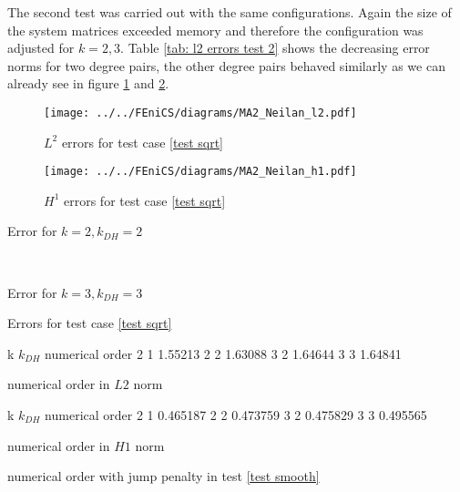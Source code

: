 
The second test was carried out with the same configurations. Again the size of the system matrices exceeded memory and therefore the configuration was adjusted for $k=2,3$. Table \ref{tab: l2 errors test 2} shows the decreasing error norms for two degree pairs, the other degree pairs behaved similarly as we can already see in figure \ref{fig: l2 errors test 2} and \ref{fig: h1 errors test 2}.
\begin{figure}[H]
\centering
	\texttt{[image: ../../FEniCS/diagrams/MA2\_Neilan\_l2.pdf]}
	\caption{$L^2$ errors for test case \ref{test sqrt} }
	\label{fig: l2 errors test 2}
\end{figure}
\begin{figure}[H]
	\centering
	\texttt{[image: ../../FEniCS/diagrams/MA2\_Neilan\_h1.pdf]}
	\caption{$H^1$ errors for test case \ref{test sqrt} }
	\label{fig: h1 errors test 2}
\end{figure}
\begin{table}[H]
	\begin{subtable}[b]{0.45\textwidth}
		\centering
		\pgfplotstabletypeset[
		columns={iterations, l2error, h1error,N},
		    every row 0 column 0/.style={set content=init},
		]{\MATwodegTwoTwo}
    	\caption{Error for $k=2, k_{DH}=2$}
   \end{subtable}
   ~
	\begin{subtable}[b]{0.45\textwidth}
		\centering
		\pgfplotstabletypeset[columns={iterations, l2error, h1error,N},
		    every row 0 column 0/.style={set content=init},
		]{\MATwodegThreeThree}
	\caption{Error for $k=3, k_{DH}=3$}
	\end{subtable}
	\caption{Errors for test case \ref{test sqrt}}
	\label{tab: l2 errors test 2}
\end{table}

\begin{table}[H]
\centering
\begin{subtable}[b]{0.45\textwidth}
	\pgfplotstabletypeset
	{
		k $k_{DH}$ {numerical order}
		2 1 1.55213
		2 2 1.63088 
		3 2 1.64644
		3 3 1.64841
	}
	\caption{numerical order in $L2$ norm}
	\end{subtable}
	\begin{subtable}[b]{0.45\textwidth}
	\pgfplotstabletypeset
	{
		k $k_{DH}$ {numerical order}
		2 1 0.465187
		2 2 0.473759
		3 2 0.475829
		3 3  0.495565
	}
	\caption{numerical order in $H1$ norm}
	\end{subtable}
	\caption{numerical order with jump penalty in test \ref{test smooth}}
\label{tab: order jump test 2}
\end{table}

